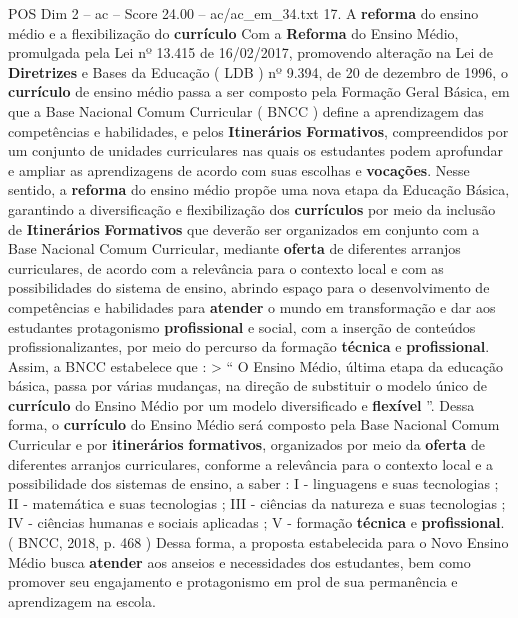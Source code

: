 \begin{textsample}{POS Dim 2 – ac – Score 24.00 – ac/ac\_em\_34.txt}  \label{ex:f2_pos_168}
17.
A \textbf{reforma} do ensino médio e a flexibilização do \textbf{currículo} Com a \textbf{Reforma} do Ensino Médio, promulgada pela Lei nº 13.415 de 16/02/2017, promovendo alteração na Lei de \textbf{Diretrizes} e Bases da Educação ( LDB ) nº 9.394, de 20 de dezembro de 1996, o \textbf{currículo} de ensino médio passa a ser composto pela Formação Geral Básica, em que a Base Nacional Comum Curricular ( BNCC ) define a aprendizagem das competências e habilidades, e pelos \textbf{Itinerários} \textbf{Formativos}, compreendidos por um conjunto de unidades curriculares nas quais os estudantes podem aprofundar e ampliar as aprendizagens de acordo com suas escolhas e \textbf{vocações}.
Nesse sentido, a \textbf{reforma} do ensino médio propõe uma nova etapa da Educação Básica, garantindo a diversificação e flexibilização dos \textbf{currículos} por meio da inclusão de \textbf{Itinerários} \textbf{Formativos} que deverão ser organizados em conjunto com a Base Nacional Comum Curricular, mediante \textbf{oferta} de diferentes arranjos curriculares, de acordo com a relevância para o contexto local e com as possibilidades do sistema de ensino, abrindo espaço para o desenvolvimento de competências e habilidades para \textbf{atender} o mundo em transformação e dar aos estudantes protagonismo \textbf{profissional} e social, com a inserção de conteúdos profissionalizantes, por meio do percurso da formação \textbf{técnica} e \textbf{profissional}.
Assim, a BNCC estabelece que : > “ O Ensino Médio, última etapa da educação básica, passa por várias mudanças, na direção de substituir o modelo único de \textbf{currículo} do Ensino Médio por um modelo diversificado e \textbf{flexível} ”.
Dessa forma, o \textbf{currículo} do Ensino Médio será composto pela Base Nacional Comum Curricular e por \textbf{itinerários} \textbf{formativos}, organizados por meio da \textbf{oferta} de diferentes arranjos curriculares, conforme a relevância para o contexto local e a possibilidade dos sistemas de ensino, a saber : I - linguagens e suas tecnologias ; II - matemática e suas tecnologias ; III - ciências da natureza e suas tecnologias ; IV - ciências humanas e sociais aplicadas ; V - formação \textbf{técnica} e \textbf{profissional}. ( BNCC, 2018, p. 468 ) Dessa forma, a proposta estabelecida para o Novo Ensino Médio busca \textbf{atender} aos anseios e necessidades dos estudantes, bem como promover seu engajamento e protagonismo em prol de sua permanência e aprendizagem na escola.

\end{textsample}
